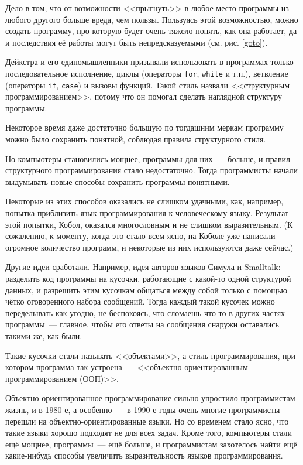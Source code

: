 \documentclass[
  paper=a4,
  fontsize=14pt,
  openany,
  appendixprefix=true
]{scrbook}
\begin{document}
Дело в том, что от возможности <<прыгнуть>> в любое место программы из любого другого больше вреда, чем пользы. Пользуясь этой возможностью, можно создать программу, про которую будет очень тяжело понять, как она работает, да и последствия её работы могут быть непредсказуемыми (см. рис. \ref{goto}).

Дейкстра и его единомышленники призывали использовать в программах только последовательное исполнение, циклы (операторы \lstinline{for}, \lstinline{while} и т.п.), ветвление (операторы \lstinline{if}, \lstinline{case}) и вызовы функций. Такой стиль назвали <<структурным программированием>>, потому что он помогал сделать наглядной структуру программы.

Некоторое время даже достаточно большую по тогдашним меркам программу можно было сохранить понятной, соблюдая правила структурного стиля.

Но компьютеры становились мощнее, программы для них~--- больше, и правил структурного программирования стало недостаточно. Тогда программисты начали выдумывать новые способы сохранить программы понятными.

Некоторые из этих способов оказались не слишком удачными, как, например, попытка приблизить язык программирования к человеческому языку. Результат этой попытки, Кобол, оказался многословным и не слишком выразительным. (К сожалению, к моменту, когда это стало всем ясно, на Коболе уже написали огромное количество программ, и некоторые из них используются даже сейчас.)

Другие идеи сработали. Например, идея авторов языков Симула и Smalltalk: разделить код программы на кусочки, работающие с какой-то одной структурой данных, и разрешить этим кусочкам общаться между собой только с помощью чётко оговоренного набора сообщений. Тогда каждый такой кусочек можно переделывать как угодно, не беспокоясь, что сломаешь что-то в других частях программы~--- главное, чтобы его ответы на сообщения снаружи оставались такими же, как были.

{\emergencystretch=15pt Такие кусочки стали называть <<объектами>>, а стиль программирования, при котором программа так устроена~--- <<объектно-ори\-ен\-ти\-ро\-ван\-ным прог\-рам\-ми\-ро\-ва\-ни\-ем (ООП)>>.

}
Объектно-ориентированное программирование сильно упростило программистам жизнь, и в 1980-е, а особенно~--- в 1990-е годы очень многие программисты перешли на объектно-ориентированные языки. Но со временем стало ясно, что такие языки хорошо подходят не для всех задач. Кроме того, компьютеры стали ещё мощнее, программы~--- ещё больше, и программистам захотелось найти ещё какие-нибудь способы увеличить выразительность языков программирования.
\end{document}
